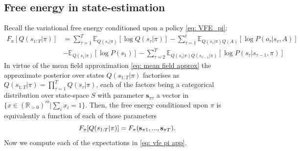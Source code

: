 \documentclass[review,12pt,authoryear]{elsarticle}
\newcommand{\R}{\mathbb R}
\newcommand{\E}{\mathbb E}
\begin{document}
\subsection{Free energy in state-estimation}
Recall the variational free energy conditioned upon a policy \eqref{eq: VFE_pi}:
\begin{equation}
\label{eq: vfe pi app}
  	    \begin{split}
  	        F_\pi[Q(s_{1:T}|\pi)] & = \sum_{\tau =1}^T\E_{Q(s_\tau |\pi)}[\log Q(s_\tau |\pi)] -\sum_{\tau = 1}^t \E_{Q(s_\tau |\pi)Q(A)}[\log P(o_{\tau}|s_{\tau},A)] \\
  	        &-\E_{Q(s_1 |\pi)}[\log P(s_1)]-\sum_{\tau =2}^T \E_{Q(s_\tau |\pi)Q(s_{\tau-1} |\pi)}[\log P(s_\tau |s_{\tau-1},\pi)]
      	    \end{split}
  \end{equation}
In virtue of the mean field approximation \eqref{eq: mean field approx} the approximate posterior over states $Q(s_{1:T}|\pi)$ factorises as $Q(s_{1:T}|\pi)= \prod_{\tau=1}^T Q(s_\tau|\pi)$, each of the factors being a categorical distribution over state-space $S$ with parameter $\mathbf s_{\pi \tau}$ a vector in $\{x \in (\R_{>0})^m | \sum_{i}x_i=1\}$. Then, the free energy conditioned upon $\pi$ is equivalently a function of each of those parameters
\begin{equation*}
    F_\pi[Q(s_{1:T}|\pi)] = F_\pi(\bold s_{\pi 1},...,\bold s_{\pi T}).
\end{equation*}
Now we compute each of the expectations in \eqref{eq: vfe pi app}.
\end{document}
